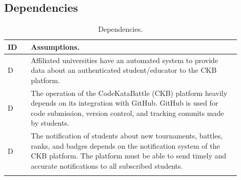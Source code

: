\subsection{Dependencies}

\setcounter{dc}{0}
\newcommand{\cd}{\stepcounter{dc}\theac}

\newcommand{\dcrow}[1]{
    C\cd & #1 \\
    \hline
}

\begin{center}
    \begin{longtable}{ |l|p{0.9\linewidth}| }
        \hline
        \textbf{ID} & \textbf{Assumptions}.                                   \\
        \hline
        D\cd        & Affiliated universities have an automated system to provide data about an authenticated student/educator to the CKB platform.                                  \\
        \hline
        D\cd        &  The operation of the CodeKataBattle (CKB) platform heavily depends on its integration with GitHub. 
        GitHub is used for code submission, version control, and tracking commits made by students. \\
        \hline
        D\cd        & The notification of students about new tournaments, battles, ranks, and badges depends on the notification system of the CKB platform. 
        The platform must be able to send timely and accurate notifications to all subscribed students.                                                             \\
        \hline
        \caption{Dependencies.}
        \label{tab:dependencies_tab}%
    \end{longtable}
\end{center}